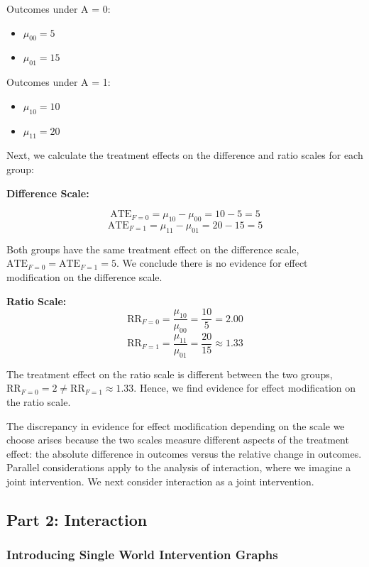 \documentclass[
  single column]{article}
\providecommand{\tightlist}{%
  \setlength{\itemsep}{0pt}\setlength{\parskip}{0pt}}\usepackage{longtable,booktabs,array}
\begin{document}
Outcomes under A = 0:

\begin{itemize}
\tightlist
\item
  \(\mu_{00} = 5\)
\item
  \(\mu_{01} = 15\)
\end{itemize}

Outcomes under A = 1:

\begin{itemize}
\tightlist
\item
  \(\mu_{10} = 10\)
\item
  \(\mu_{11} = 20\)
\end{itemize}

Next, we calculate the treatment effects on the difference and ratio
scales for each group:

\textbf{Difference Scale:}

\[
\text{ATE}_{F = 0} = \mu_{10} - \mu_{00} = 10 - 5 = 5
\] \[
\text{ATE}_{F = 1} = \mu_{11} - \mu_{01} = 20 - 15 = 5
\]

Both groups have the same treatment effect on the difference scale,
\(\text{ATE}_{F = 0} = \text{ATE}_{F = 1} = 5\). We conclude there is no
evidence for effect modification on the difference scale.

\textbf{Ratio Scale:} \[
\text{RR}_{F = 0} = \frac{\mu_{10}}{\mu_{00}} = \frac{10}{5} = 2.00
\] \[
\text{RR}_{F = 1} = \frac{\mu_{11}}{\mu_{01}} = \frac{20}{15} \approx 1.33
\]

The treatment effect on the ratio scale is different between the two
groups, \(\text{RR}_{F = 0} = 2 \neq \text{RR}_{F = 1} \approx 1.33\).
Hence, we find evidence for effect modification on the ratio scale.

The discrepancy in evidence for effect modification depending on the
scale we choose arises because the two scales measure different aspects
of the treatment effect: the absolute difference in outcomes versus the
relative change in outcomes. Parallel considerations apply to the
analysis of interaction, where we imagine a joint intervention. We next
consider interaction as a joint intervention.

\subsection{Part 2: Interaction}\label{id-sec-2}

\subsubsection{Introducing Single World Intervention
Graphs}\label{introducing-single-world-intervention-graphs}
\end{document}
